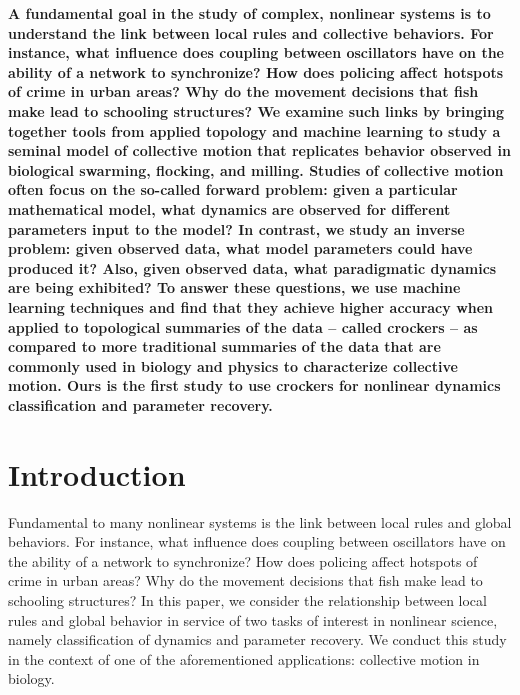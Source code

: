 \documentclass[%
 aip,
reprint,
 amsmath,amssymb,
 aps,
showkeys
]{revtex4-1}
\begin{document}
\maketitle

{\bf A fundamental goal in the study of complex, nonlinear systems is to understand the link between local rules and collective behaviors. For instance, what influence does coupling between oscillators have on the ability of a network to synchronize? How does policing affect hotspots of crime in urban areas? Why do the movement decisions that fish make lead to schooling structures? We examine such links by bringing together tools from applied topology and machine learning to study a seminal model of collective motion that replicates behavior observed in biological swarming, flocking, and milling. Studies of collective motion often focus on the so-called forward problem: given a particular mathematical model, what dynamics are observed for different parameters input to the model? In contrast, we study an inverse problem: given observed data, what model parameters could have produced it? Also, given observed data, what paradigmatic dynamics are being exhibited? To answer these questions, we use machine learning techniques and find that they achieve higher accuracy when applied to topological summaries of the data -- called crockers -- as compared to more traditional summaries of the data that are commonly used in biology and physics to characterize collective motion. Ours is the first study to use crockers for nonlinear dynamics classification and parameter recovery.}

\section{\label{sec:intro}Introduction}

Fundamental to many nonlinear systems is the link between local rules and global behaviors. For instance, what influence does coupling between oscillators have on the ability of a network to synchronize? How does policing affect hotspots of crime in urban areas? Why do the movement decisions that fish make lead to schooling structures? In this paper, we consider the relationship between local rules and global behavior in service of two tasks of interest in nonlinear science, namely classification of dynamics and parameter recovery. We conduct this study in the context of one of the  aforementioned applications: collective motion in biology.
\end{document}
